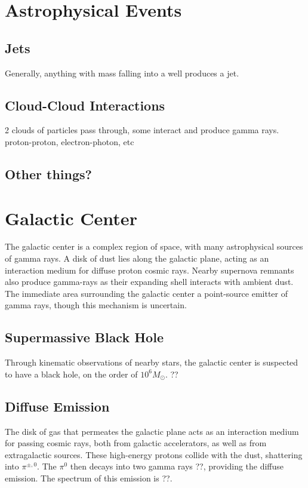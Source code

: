 \section{Astrophysical Events}

\subsection{Jets}
Generally, anything with mass falling into a well produces a jet.

\subsection{Cloud-Cloud Interactions}
2 clouds of particles pass through, some interact and produce gamma rays.
proton-proton, electron-photon, etc

\subsection{Other things?}

\section{Galactic Center}

The galactic center is a complex region of space, with many astrophysical sources of gamma rays.
A disk of dust lies along the galactic plane, acting as an interaction medium for diffuse proton cosmic rays.
Nearby supernova remnants also produce gamma-rays as their expanding shell interacts with ambient dust.
The immediate area surrounding the galactic center a point-source emitter of gamma rays, though this mechanism is uncertain.

\subsection{Supermassive Black Hole}

Through kinematic observations of nearby stars, the galactic center is suspected to have a black hole, on the order of $10^6 M_{\odot}$. ??

\subsection{Diffuse Emission}
The disk of gas that permeates the galactic plane acts as an interaction medium for passing cosmic rays, both from galactic accelerators, as well as from extragalactic sources.
These high-energy protons collide with the dust, shattering into $\pi^{\pm,0}$.
The $\pi^0$ then decays into two gamma rays ??, providing the diffuse emission.
The spectrum of this emission is ??.


